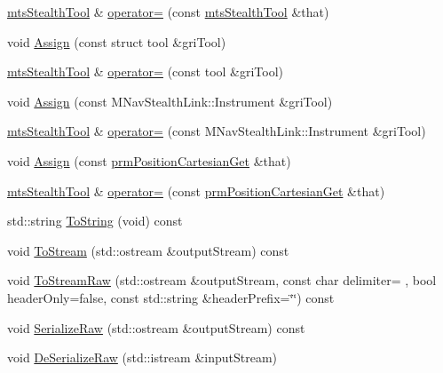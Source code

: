 \begin{DoxyCompactItemize}
\item 
\hyperlink{classmts_stealth_tool}{mts\+Stealth\+Tool} \& \hyperlink{classmts_stealth_tool_a8e34fac36f9e6eb356116e06d9ab61c2}{operator=} (const \hyperlink{classmts_stealth_tool}{mts\+Stealth\+Tool} \&that)
\item 
void \hyperlink{classmts_stealth_tool_aefb688f5db9e6cb54d8af92196928b81}{Assign} (const struct tool \&gri\+Tool)
\item 
\hyperlink{classmts_stealth_tool}{mts\+Stealth\+Tool} \& \hyperlink{classmts_stealth_tool_aa727d88e875cc02aeeebfb7fcc47afdd}{operator=} (const tool \&gri\+Tool)
\item 
void \hyperlink{classmts_stealth_tool_aca8cf9986410e2b155c77b4a58faee83}{Assign} (const M\+Nav\+Stealth\+Link\+::\+Instrument \&gri\+Tool)
\item 
\hyperlink{classmts_stealth_tool}{mts\+Stealth\+Tool} \& \hyperlink{classmts_stealth_tool_a8a9407407b9126f0195af0a4abe945c5}{operator=} (const M\+Nav\+Stealth\+Link\+::\+Instrument \&gri\+Tool)
\item 
void \hyperlink{classmts_stealth_tool_a371596656a661001c3691ae510dab17b}{Assign} (const \hyperlink{classprm_position_cartesian_get}{prm\+Position\+Cartesian\+Get} \&that)
\item 
\hyperlink{classmts_stealth_tool}{mts\+Stealth\+Tool} \& \hyperlink{classmts_stealth_tool_afd3d34f5974e9e9d182c0cf7b58b1c5e}{operator=} (const \hyperlink{classprm_position_cartesian_get}{prm\+Position\+Cartesian\+Get} \&that)
\item 
std\+::string \hyperlink{classmts_stealth_tool_a18a31c80172f4f6280673c1db6ca8c5b}{To\+String} (void) const 
\item 
void \hyperlink{classmts_stealth_tool_a7550641c7e9eb89a5d1a77f4d48c47e9}{To\+Stream} (std\+::ostream \&output\+Stream) const 
\item 
void \hyperlink{classmts_stealth_tool_a6bfabcb3bee465c02dc9c42578dfd220}{To\+Stream\+Raw} (std\+::ostream \&output\+Stream, const char delimiter= \textquotesingle{} \textquotesingle{}, bool header\+Only=false, const std\+::string \&header\+Prefix=\char`\"{}\char`\"{}) const 
\item 
void \hyperlink{classmts_stealth_tool_a1fa41dcc1d7260a3ddd7f2d5ea7732c9}{Serialize\+Raw} (std\+::ostream \&output\+Stream) const 
\item 
void \hyperlink{classmts_stealth_tool_ad346445c8f547aac0f99e869a585d90a}{De\+Serialize\+Raw} (std\+::istream \&input\+Stream)
\end{DoxyCompactItemize}
